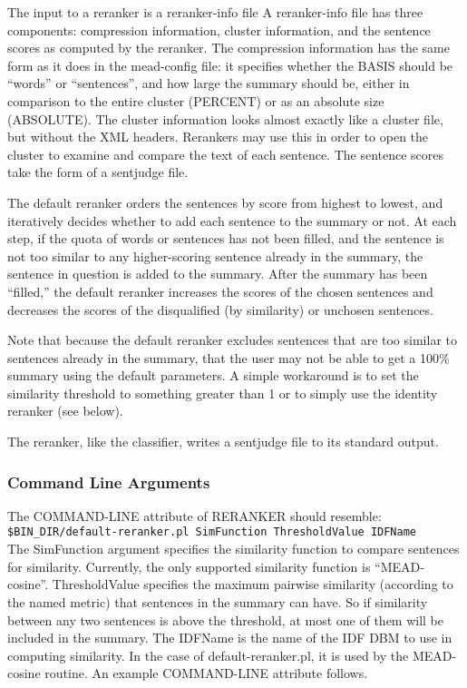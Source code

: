\documentclass[10pt]{article}
\begin{document}
The input to a reranker is a reranker-info file
A reranker-info file has three components:  compression
information, cluster information, and the sentence scores
as computed by the reranker.  
The compression information
has the same form as it does in the mead-config file: it 
specifies whether the BASIS should be ``words'' or ``sentences'',
and how large the summary should be, either in comparison 
to the entire cluster (PERCENT) or as an absolute size
(ABSOLUTE).
The cluster information looks almost exactly like a cluster
file, but without the XML headers.  Rerankers may use this 
in order to open the cluster to examine and compare the
text of each sentence. The sentence scores take the form 
of a sentjudge file.

The default reranker orders the sentences by score from highest to
lowest, and iteratively decides whether to add each sentence
to the summary or not.  At each step, if the quota of words 
or sentences has not been filled, and the sentence is not too 
similar to any higher-scoring sentence already in the summary, 
the sentence in question is added to the summary.
After the summary has been ``filled,'' the default reranker 
increases the scores of the chosen sentences and decreases
the scores of the disqualified (by similarity) or unchosen
sentences.

Note that because the default reranker excludes sentences that
are too similar to sentences already in the summary, that the
user may not be able to get a 100\% summary using the default
parameters.  A simple workaround is to set the similarity
threshold to something greater than 1 or to simply use the 
identity reranker (see below).

The reranker, like the classifier, writes a sentjudge
file to its standard output.

\subsubsection{Command Line Arguments}

The COMMAND-LINE attribute of RERANKER should resemble:\\

    \verb|$BIN_DIR/default-reranker.pl SimFunction ThresholdValue IDFName|\\

The SimFunction argument specifies the similarity function
to compare sentences for similarity.  Currently, the only
supported similarity function is ``MEAD-cosine''.  ThresholdValue
specifies the maximum pairwise similarity (according to the
named metric) that sentences in the summary can have.  So if 
similarity between any two sentences is above the threshold, at most
one of them will be included in the summary.  The IDFName is
the name of the IDF DBM to use in computing similarity.  In 
the case of default-reranker.pl, it is used by the MEAD-cosine
routine.  An example COMMAND-LINE attribute follows.\\
\end{document}
